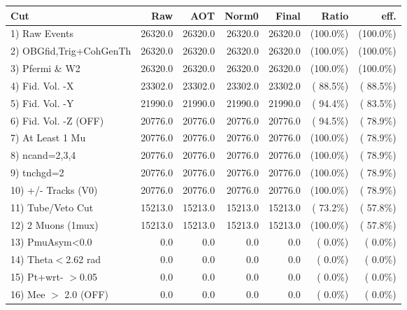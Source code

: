 \begin{table}[h!]\centering
 \begin{tabular}{||l||r|r|r|r|r|r||}
 \hline
 \hline
 Cut & Raw & AOT & Norm0 & Final & Ratio & eff.       \\
 \hline
  1) Raw Events           &      26320.0 &      26320.0 &      26320.0 &      26320.0 & (100.0\%) & (100.0\%) \\
  2) OBGfid,Trig+CohGenTh &      26320.0 &      26320.0 &      26320.0 &      26320.0 & (100.0\%) & (100.0\%) \\
  3) Pfermi \& W2         &      26320.0 &      26320.0 &      26320.0 &      26320.0 & (100.0\%) & (100.0\%) \\
  4) Fid. Vol. -X         &      23302.0 &      23302.0 &      23302.0 &      23302.0 & ( 88.5\%) & ( 88.5\%) \\
  5) Fid. Vol. -Y         &      21990.0 &      21990.0 &      21990.0 &      21990.0 & ( 94.4\%) & ( 83.5\%) \\
  6) Fid. Vol. -Z (OFF)   &      20776.0 &      20776.0 &      20776.0 &      20776.0 & ( 94.5\%) & ( 78.9\%) \\
  7) At Least 1 Mu        &      20776.0 &      20776.0 &      20776.0 &      20776.0 & (100.0\%) & ( 78.9\%) \\
  8) ncand=2,3,4          &      20776.0 &      20776.0 &      20776.0 &      20776.0 & (100.0\%) & ( 78.9\%) \\
  9) tnchgd=2             &      20776.0 &      20776.0 &      20776.0 &      20776.0 & (100.0\%) & ( 78.9\%) \\
 10) +/- Tracks (V0)      &      20776.0 &      20776.0 &      20776.0 &      20776.0 & (100.0\%) & ( 78.9\%) \\
 11) Tube/Veto Cut        &      15213.0 &      15213.0 &      15213.0 &      15213.0 & ( 73.2\%) & ( 57.8\%) \\
 12) 2 Muons (1mux)       &      15213.0 &      15213.0 &      15213.0 &      15213.0 & (100.0\%) & ( 57.8\%) \\
 13) PmuAsym<0.0          &          0.0 &          0.0 &          0.0 &          0.0 & (  0.0\%) & (  0.0\%) \\
 14) Theta$<$2.62 rad     &          0.0 &          0.0 &          0.0 &          0.0 & (  0.0\%) & (  0.0\%) \\
 15) Pt+wrt- $>$0.05      &          0.0 &          0.0 &          0.0 &          0.0 & (  0.0\%) & (  0.0\%) \\
 16) Mee $>$ 2.0  (OFF)   &          0.0 &          0.0 &          0.0 &          0.0 & (  0.0\%) & (  0.0\%) \\

\end{tabular}
\end{table}
